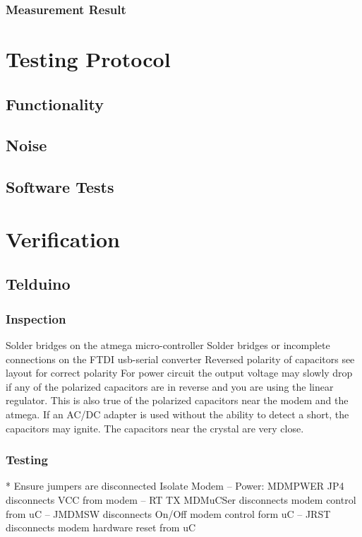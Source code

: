 \documentclass[]{article}
\begin{document}
\subsubsection{Measurement Result}

\section{Testing Protocol}
\subsection{Functionality}
\subsection{Noise}
\subsection{Software Tests}

\section{Verification}
    \subsection{Telduino}
        \subsubsection{Inspection}
            Solder bridges on the atmega micro-controller
            Solder bridges or incomplete connections on the FTDI usb-serial converter
            Reversed polarity of capacitors see layout for correct polarity
                For power circuit the output voltage may slowly drop if any of the polarized capacitors are in reverse and you are using the linear regulator.
                This is also true of the polarized capacitors near the modem and the atmega.
                If an AC/DC adapter is used without the ability to detect a short, the capacitors may ignite.
                The capacitors near the crystal are very close.

        \subsubsection{Testing}
            * Ensure jumpers are disconnected
                 Isolate Modem
                 -- Power: MDMPWER JP4 disconnects VCC from modem
                 -- RT TX MDMuCSer disconnects modem control from uC
                 -- JMDMSW disconnects On/Off modem control form uC
                 -- JRST disconnects modem hardware reset from uC
                 
\end{document}
